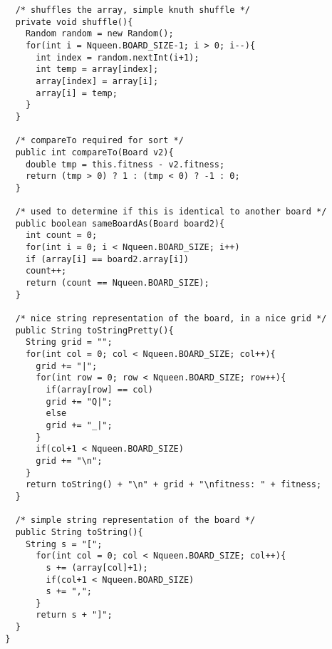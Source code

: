 \documentclass[a4paper,11pt]{article}
\begin{document}
\begin{lstlisting}
    /* shuffles the array, simple knuth shuffle */
    private void shuffle(){
      Random random = new Random();
      for(int i = Nqueen.BOARD_SIZE-1; i > 0; i--){
        int index = random.nextInt(i+1);
        int temp = array[index];
        array[index] = array[i];
        array[i] = temp;
      }
    }

    /* compareTo required for sort */
    public int compareTo(Board v2){
      double tmp = this.fitness - v2.fitness;
      return (tmp > 0) ? 1 : (tmp < 0) ? -1 : 0;
    }

    /* used to determine if this is identical to another board */
    public boolean sameBoardAs(Board board2){
      int count = 0;
      for(int i = 0; i < Nqueen.BOARD_SIZE; i++)
      if (array[i] == board2.array[i])
      count++;
      return (count == Nqueen.BOARD_SIZE);
    }

    /* nice string representation of the board, in a nice grid */
    public String toStringPretty(){
      String grid = "";
      for(int col = 0; col < Nqueen.BOARD_SIZE; col++){
        grid += "|";
        for(int row = 0; row < Nqueen.BOARD_SIZE; row++){
          if(array[row] == col)
          grid += "Q|";
          else
          grid += "_|";
        }
        if(col+1 < Nqueen.BOARD_SIZE)
        grid += "\n";
      }
      return toString() + "\n" + grid + "\nfitness: " + fitness;
    }

    /* simple string representation of the board */
    public String toString(){
      String s = "[";
        for(int col = 0; col < Nqueen.BOARD_SIZE; col++){
          s += (array[col]+1);
          if(col+1 < Nqueen.BOARD_SIZE)
          s += ",";
        }
        return s + "]";
    }
  }

\end{lstlisting}
\end{document}
